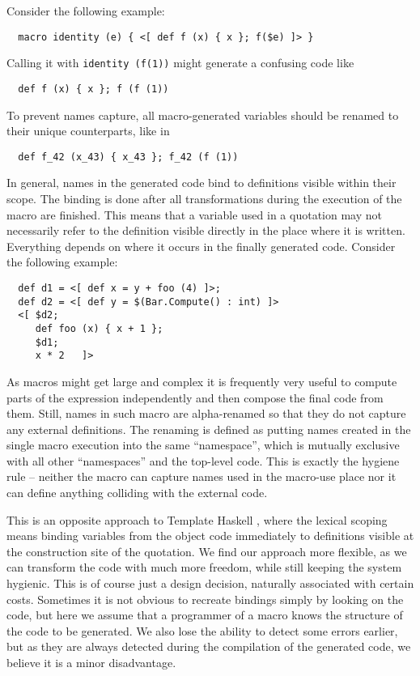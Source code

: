\documentclass{llncs}
\begin{document}
Consider the following example:

\begin{verbatim}
  macro identity (e) { <[ def f (x) { x }; f($e) ]> }
\end{verbatim} %

Calling it with \verb,identity (f(1)), might generate a confusing code like

\begin{verbatim}
  def f (x) { x }; f (f (1))
\end{verbatim}

To prevent names capture, all macro-generated variables should be renamed 
to their unique counterparts, like in

\begin{verbatim}
  def f_42 (x_43) { x_43 }; f_42 (f (1))
\end{verbatim}

In general, names in the generated code bind to definitions visible within 
their scope. The binding is done after all transformations during the execution
of the macro are finished. This means that a variable used in a quotation 
may not necessarily refer to the definition visible directly in the place 
where it is written. Everything depends on where it occurs in the finally 
generated code. Consider the following example:

\begin{verbatim}
  def d1 = <[ def x = y + foo (4) ]>;
  def d2 = <[ def y = $(Bar.Compute() : int) ]>
  <[ $d2;
     def foo (x) { x + 1 };
     $d1;
     x * 2   ]>
\end{verbatim}       %

As macros might get large and complex it is frequently very useful to compute
parts of the expression independently and then compose the final code from them.
Still, names in such macro are alpha-renamed so that they do not capture any 
external definitions. The renaming is defined as putting names created 
in the single macro execution into the same ``namespace'', which is
mutually exclusive with all other ``namespaces'' and the top-level code.
This is exactly the hygiene rule -- neither the macro can capture names
used in the macro-use place nor it can define anything colliding with the 
external code. 

This is an opposite approach to Template Haskell \cite{Haskell:Meta}, 
where the lexical scoping means binding variables from the object code immediately 
to definitions visible at the construction site of the quotation.
We find our approach more flexible, as we can transform the code with much
more freedom, while still keeping the system hygienic. This is of course just 
a design decision, naturally associated with certain costs. Sometimes it is not 
obvious to recreate bindings simply by looking on the code, but here we assume 
that a programmer of a macro knows the structure of the code to be generated. 
We also lose the ability to detect some errors earlier, but as they are always 
detected during the compilation of the generated code, we believe it is 
a minor disadvantage. 
\end{document}

